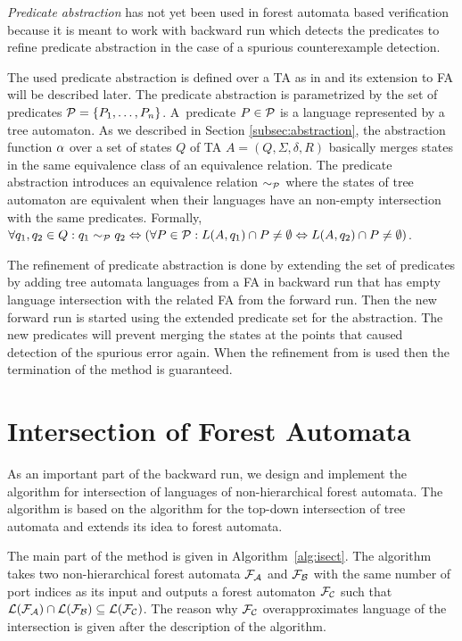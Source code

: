 \emph{Predicate abstraction} has not yet been used in forest automata based verification
because it is meant to work with backward run
which detects the predicates to refine predicate abstraction
in the case of a spurious counterexample detection.

The used predicate abstraction is defined over a TA as in \cite{artmc}
and its extension to FA will be described later.
The predicate abstraction is parametrized by the set of predicates $\mathcal{P}=\{P_1, \ldots, P_n\}$.
A~predicate $P \in \mathcal{P}$ is a language represented by
a tree automaton.
As we described in Section \ref{subsec:abstraction}, the abstraction function $\alpha$
over a set of states $Q$ of TA $A=(Q,\Sigma,\delta, R)$ basically
merges states in the same equivalence class of an equivalence relation.
The predicate abstraction introduces an equivalence relation $\sim_{\mathcal{P}}$
where the states of tree automaton are equivalent when
their languages have an non-empty intersection with the same predicates.
Formally, $\forall q_1,q_2 \in Q: q_1 \sim_{\mathcal{P}} q_2 \Leftrightarrow
(\forall P \in \mathcal{P}: L(A,q_1) \cap P \neq \emptyset
\Leftrightarrow L(A,q_2) \cap P \neq \emptyset)$.

The refinement of predicate abstraction is done by extending the
set of predicates by adding tree automata languages from
a FA in backward run that has empty language
intersection with the related FA from the forward run.
Then the new forward run is started using the extended predicate
set for the abstraction.
The new predicates will prevent merging the states at the points
that caused detection of the spurious error again.
When the refinement from \cite{artmc} is used
then the termination of the method is guaranteed.

\section{Intersection of Forest Automata}
\label{sec:isect}
As an important part of the backward run,
we design and implement the algorithm for intersection
of languages of non-hierarchical forest automata.
The algorithm is based on the algorithm for the top-down
intersection of tree automata and extends its idea to forest automata.

The main part of the method is given in Algorithm~\ref{alg:isect}.
The algorithm takes two non-hierarchical forest automata $\mathcal{F}_{\mathcal{A}}$
and $\mathcal{F}_{\mathcal{B}}$ with the same number of port indices
as its input and outputs a forest automaton $\mathcal{F}_{\mathcal{C}}$ such that
$\mathcal{L}(\mathcal{F}_{\mathcal{A}}) \cap \mathcal{L}(\mathcal{F}_{\mathcal{B}}) \subseteq \mathcal{L}(\mathcal{F}_{\mathcal{C}})$.
The reason why $\mathcal{F}_{\mathcal{C}}$ overapproximates language
of the intersection is given after the description of the algorithm.

